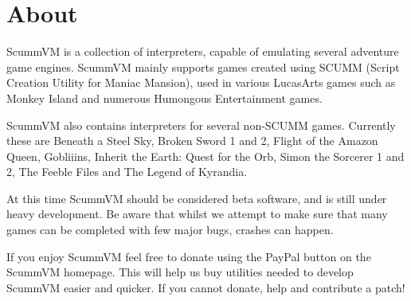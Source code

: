 


\section{About}

ScummVM is a collection of interpreters, capable of emulating several
adventure game engines. ScummVM mainly supports games created using
SCUMM (Script Creation Utility for Maniac Mansion), used in various
LucasArts games such as Monkey Island and numerous Humongous Entertainment
games.

ScummVM also contains interpreters for several non-SCUMM games. Currently
these are Beneath a Steel Sky, Broken Sword 1 and 2, Flight of the
Amazon Queen, Gobliiins, Inherit the Earth: Quest for the Orb,
Simon the Sorcerer 1 and 2, The Feeble Files and The Legend of Kyrandia.

At this time ScummVM should be considered beta software, and is still
under heavy development. Be aware that whilst we attempt to make sure
that many games can be completed with few major bugs, crashes can happen.

If you enjoy ScummVM feel free to donate using the PayPal button on the
ScummVM homepage. This will help us buy utilities needed to develop ScummVM
easier and quicker. If you cannot donate, help and contribute a patch!
